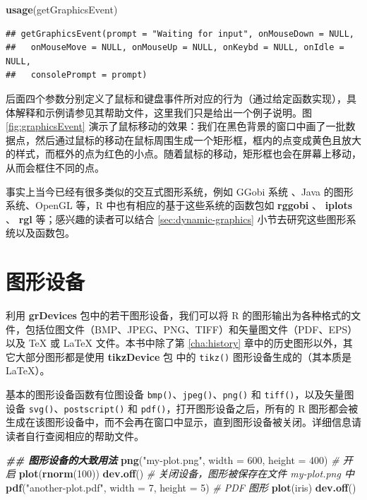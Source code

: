 \documentclass[
  b5paper,
  UTF8,twoside]{book}
\newenvironment{Shaded}{\begin{snugshade}}{\end{snugshade}}
\newcommand{\AttributeTok}[1]{\textcolor[rgb]{0.13,0.29,0.53}{#1}}
\newcommand{\CommentTok}[1]{\textcolor[rgb]{0.56,0.35,0.01}{\textit{#1}}}
\newcommand{\DecValTok}[1]{\textcolor[rgb]{0.00,0.00,0.81}{#1}}
\newcommand{\DocumentationTok}[1]{\textcolor[rgb]{0.56,0.35,0.01}{\textbf{\textit{#1}}}}
\newcommand{\FunctionTok}[1]{\textcolor[rgb]{0.13,0.29,0.53}{\textbf{#1}}}
\newcommand{\NormalTok}[1]{#1}
\newcommand{\StringTok}[1]{\textcolor[rgb]{0.31,0.60,0.02}{#1}}
\begin{document}
\begin{Shaded}
\begin{Highlighting}[]
\FunctionTok{usage}\NormalTok{(getGraphicsEvent)}
\end{Highlighting}
\end{Shaded}

\begin{verbatim}
## getGraphicsEvent(prompt = "Waiting for input", onMouseDown = NULL,
##   onMouseMove = NULL, onMouseUp = NULL, onKeybd = NULL, onIdle = NULL,
##   consolePrompt = prompt)
\end{verbatim}

后面四个参数分别定义了鼠标和键盘事件所对应的行为（通过给定函数实现），具体解释和示例请参见其帮助文件，这里我们只是给出一个例子说明。图 \ref{fig:graphicsEvent} 演示了鼠标移动的效果：我们在黑色背景的窗口中画了一批数据点，然后通过鼠标的移动在鼠标周围生成一个矩形框，框内的点变成黄色且放大的样式，而框外的点为红色的小点。随着鼠标的移动，矩形框也会在屏幕上移动，从而会框住不同的点。

事实上当今已经有很多类似的交互式图形系统，例如 GGobi 系统 \citep{Cook07}、Java 的图形系统、OpenGL 等，R 中也有相应的基于这些系统的函数包如 \textbf{rggobi} \citep{rggobi}、 \textbf{iplots} \citep{iplots}、 \textbf{rgl} \citep{rgl} 等；感兴趣的读者可以结合 \ref{sec:dynamic-graphics} 小节去研究这些图形系统以及函数包。

\section{图形设备}\label{sec:device}

利用 \textbf{grDevices} 包中的若干图形设备，我们可以将 R 的图形输出为各种格式的文件，包括位图文件（BMP、JPEG、PNG、TIFF）和矢量图文件（PDF、EPS）以及 TeX 或 LaTeX 文件。本书中除了第 \ref{cha:history} 章中的历史图形以外，其它大部分图形都是使用 \textbf{tikzDevice} 包 \citep{tikzDevice} 中的 \texttt{tikz()} 图形设备生成的（其本质是 LaTeX）。

基本的图形设备函数有位图设备 \texttt{bmp()}、\texttt{jpeg()}、\texttt{png()} 和 \texttt{tiff()}，以及矢量图设备 \texttt{svg()}、\texttt{postscript()} 和 \texttt{pdf()}，打开图形设备之后，所有的 R 图形都会被生成在该图形设备中，而不会再在窗口中显示，直到图形设备被关闭。详细信息请读者自行查阅相应的帮助文件。

\begin{Shaded}
\begin{Highlighting}[]
\DocumentationTok{\#\# 图形设备的大致用法}
\FunctionTok{png}\NormalTok{(}\StringTok{"my{-}plot.png"}\NormalTok{, }\AttributeTok{width =} \DecValTok{600}\NormalTok{, }\AttributeTok{height =} \DecValTok{400}\NormalTok{) }\CommentTok{\# 开启}
\FunctionTok{plot}\NormalTok{(}\FunctionTok{rnorm}\NormalTok{(}\DecValTok{100}\NormalTok{))}
\FunctionTok{dev.off}\NormalTok{() }\CommentTok{\# 关闭设备，图形被保存在文件 my{-}plot.png 中}
\FunctionTok{pdf}\NormalTok{(}\StringTok{"another{-}plot.pdf"}\NormalTok{, }\AttributeTok{width =} \DecValTok{7}\NormalTok{, }\AttributeTok{height =} \DecValTok{5}\NormalTok{) }\CommentTok{\# PDF 图形}
\FunctionTok{plot}\NormalTok{(iris)}
\FunctionTok{dev.off}\NormalTok{()}
\end{Highlighting}
\end{Shaded}
\end{document}
